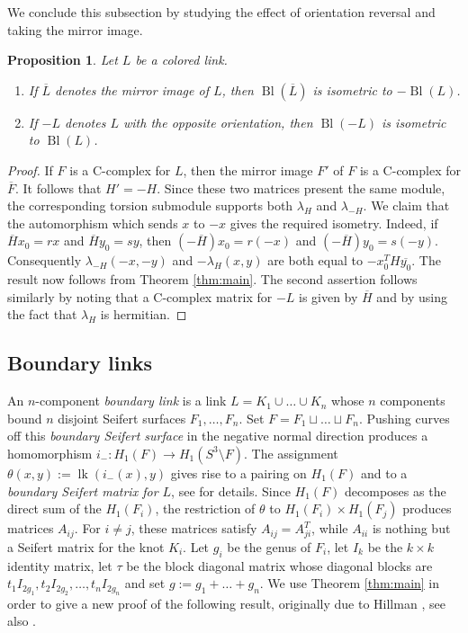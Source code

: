 \documentclass[11pt,a4paper]{amsart}
\newtheorem{proposition}[theorem]{Proposition}
\theoremstyle{definition}
\DeclareMathOperator{\lk}{lk}
\def\op{\operatorname}
\begin{document}
We conclude this subsection by studying the effect of orientation reversal and taking the mirror image.

\begin{proposition}
\label{prop:Mirror}
Let $L$ be a colored link.
\begin{enumerate}
\item If $\overline{L}$ denotes the mirror image of $L$, then $\op{Bl}(\overline{L})$ is isometric to $-\op{Bl}(L)$.
\item If $-L$ denotes $L$ with the opposite orientation, then $\op{Bl}(-L)$ is isometric to $\op{Bl}(L)$.
\end{enumerate}

\end{proposition}
\begin{proof}
If $F$ is a C-complex for $L$, then the mirror image $F'$ of $F$ is a C-complex for $\overline{F}$. It follows that $H'=-H$. Since these two matrices present the same module, the corresponding torsion submodule supports both $\lambda_H$ and $\lambda_{-H}$. We claim that the automorphism which sends $x$ to $-x$ gives the required isometry. Indeed, if $\overline{H} x_0=r x$ and $\overline{H} y_0=s y$, then $(-\overline{H})x_0=r(-x)$ and $(-\overline{H}) y_0=s (-y)$. Consequently $\lambda_{-H}(-x,-y)$ and $-\lambda_H(x,y)$ are both equal to $-x_0^TH\overline{y_0}$. The result now follows from Theorem \ref{thm:main}. The second assertion follows similarly by noting that a C-complex matrix for $-L$ is given by $\overline{H}$ and by using the fact that $\lambda_H$ is hermitian.
\end{proof} 

\subsection{Boundary links}
\label{sub:Boundary}

An $n$-component \textit{boundary link} is a link $L=K_1 \cup \ldots \cup K_n$ whose $n$ components bound $n$ disjoint Seifert surfaces $F_1, \ldots, F_n$. Set $F=F_1 \sqcup \ldots \sqcup F_n$. Pushing curves off this \emph{boundary Seifert surface} in the negative normal direction produces a homomorphism $i_- \colon H_1(F) \to H_1(S^3 \setminus F)$. The assignment $\theta(x,y):=\lk(i_-(x),y)$ gives rise to a pairing on $H_1(F)$ and to a \textit{boundary Seifert matrix for $L$}, see \cite[p.670]{Ko} for details. Since $H_1(F)$ decomposes as the direct sum of the $H_1(F_i)$, the restriction of $\theta$ to $H_1(F_i) \times H_1(F_j)$ produces matrices $A_{ij}$. For $i \neq j$, these matrices satisfy $A_{ij}=A_{ji}^T$, while  $A_{ii}$ is nothing but a Seifert matrix for the knot $K_i$. Let $g_i$ be the genus of $F_i$, let $I_k$ be the $k \times k$ identity matrix, let $\tau$ be the block diagonal matrix whose diagonal blocks are  $ t_1I_{2g_1}, t_2I_{2g_2},\ldots, t_n I_{2g_n}$ and set $g:=g_1+\ldots + g_n$. We use Theorem \ref{thm:main} in order to give a new proof of the following result, originally due to Hillman \cite[pages 122-123] {HillmanAlexanderIdeals}, see also \cite[Theorem 4.2]{CochranOrr}. 
\end{document}

